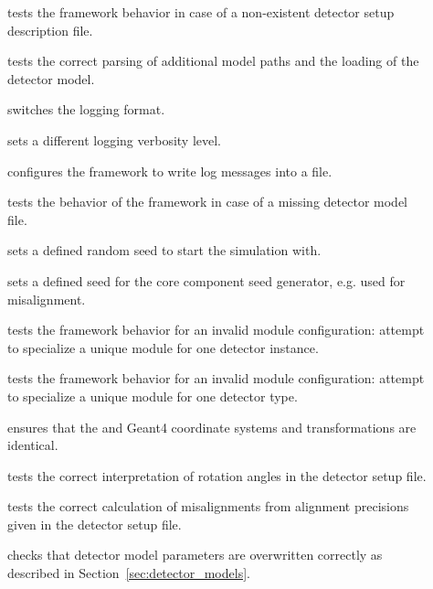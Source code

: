 \begin{description}
    \item[] tests the framework behavior in case of a non-existent detector setup description file.
    \item[] tests the correct parsing of additional model paths and the loading of the detector model.
    \item[] switches the logging format.
    \item[] sets a different logging verbosity level.
    \item[] configures the framework to write log messages into a file.
    \item[] tests the behavior of the framework in case of a missing detector model file.
    \item[] sets a defined random seed to start the simulation with.
    \item[] sets a defined seed for the core component seed generator, e.g. used for misalignment.
    \item[] tests the framework behavior for an invalid module configuration: attempt to specialize a unique module for one detector instance.
    \item[] tests the framework behavior for an invalid module configuration: attempt to specialize a unique module for one detector type.
    \item[] ensures that the \apsq and Geant4 coordinate systems and transformations are identical.
    \item[] tests the correct interpretation of rotation angles in the detector setup file.
    \item[] tests the correct calculation of misalignments from alignment precisions given in the detector setup file.
    \item[] checks that detector model parameters are overwritten correctly as described in Section~\ref{sec:detector_models}.

\end{description}
